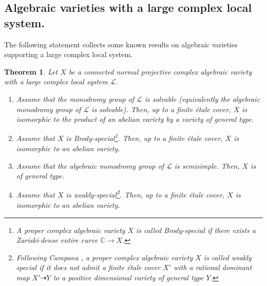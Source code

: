 \documentclass[11pt,letterpaper]{amsart}
\def\bC{\mathbb{C}}
\def\cL{\mathcal{L}}
\theoremstyle{plain}
\newtheorem{thm}{Theorem}[section]
\begin{document}
\subsection{Algebraic varieties with a large complex local system.}
The following statement collects some known results on algebraic varieties supporting a large complex local system.

 
\begin{thm}\label{known results}
Let $X$ be a connected normal projective complex algebraic variety with a large complex local system $\cL$.
\begin{enumerate}
\item Assume that the monodromy group of $\cL$ is solvable (equivalently the algebraic monodromy group of $\cL$ is solvable). Then, up to a finite étale cover, $X$ is isomorphic to the product of an abelian variety by a variety of general type.

\item Assume that $X$ is Brody-special\footnote{A proper complex algebraic variety $X$ is called Brody-special if there exists a Zariski-dense entire curve $\bC \to X$.}. Then, up to a finite étale cover, $X$ is isomorphic to an abelian variety.

\item Assume that the algebraic monodromy group of $\cL$ is semisimple. Then, $X$ is of general type.


\item Assume that $X$ is weakly-special\footnote{Following Campana \cite{Campana04}, a proper complex algebraic variety $X$ is called weakly special if it does not admit a finite étale cover $X'$ with a rational dominant map $X' \dasharrow Y$ to a positive dimensional variety of general type $Y$.}. Then, up to a finite étale cover, $X$ is isomorphic to an abelian variety.


\end{enumerate}
\end{thm}
\end{document}
